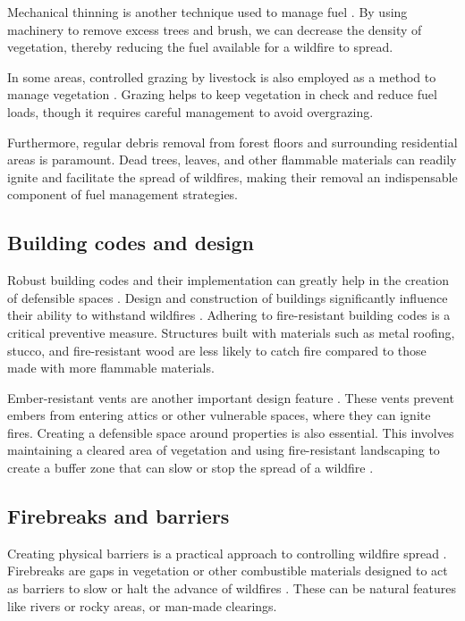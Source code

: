 \documentclass[
  12 pt,
]{Nemilov}
\begin{document}
Mechanical thinning is another technique used to manage fuel \citep{huggett2008efficacy}. By using machinery to remove excess trees and brush, we can decrease the density of vegetation, thereby reducing the fuel available for a wildfire to spread.

In some areas, controlled grazing by livestock is also employed as a method to manage vegetation \citep{donovan2022targeted, taylor2006targeted}. Grazing helps to keep vegetation in check and reduce fuel loads, though it requires careful management to avoid overgrazing.

Furthermore, regular debris removal from forest floors and surrounding residential areas is paramount. Dead trees, leaves, and other flammable materials can readily ignite and facilitate the spread of wildfires, making their removal an indispensable component of fuel management strategies.

\subsection{Building codes and design}\label{building-codes-and-design}

Robust building codes and their implementation can greatly help in the creation of defensible spaces \citep{syphard2014role}. Design and construction of buildings significantly influence their ability to withstand wildfires \citep{intini2020guidance, mcwethy2019rethinking}. Adhering to fire-resistant building codes is a critical preventive measure. Structures built with materials such as metal roofing, stucco, and fire-resistant wood are less likely to catch fire compared to those made with more flammable materials.

Ember-resistant vents are another important design feature \citep{hakes2017review}. These vents prevent embers from entering attics or other vulnerable spaces, where they can ignite fires. Creating a defensible space around properties is also essential. This involves maintaining a cleared area of vegetation and using fire-resistant landscaping to create a buffer zone that can slow or stop the spread of a wildfire \citep{ondei2024garden}.

\subsection{Firebreaks and barriers}\label{firebreaks-and-barriers}

Creating physical barriers is a practical approach to controlling wildfire spread \citep{zong2021optimal}. Firebreaks are gaps in vegetation or other combustible materials designed to act as barriers to slow or halt the advance of wildfires \citep{ankur2017fire, cui2019green}. These can be natural features like rivers or rocky areas, or man-made clearings.
\end{document}
